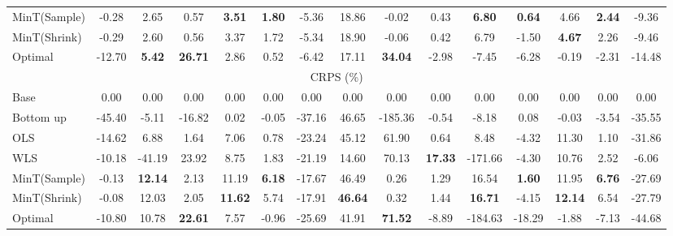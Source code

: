 \documentclass[12pt]{article}
\theoremstyle{definition}
\begin{document}
\begin{table}[H]
{\begin{tabular}{lcccccccccccccc}
			MinT(Sample) & -0.28 & 2.65 & 0.57 & \textbf{3.51} & \textbf{1.80} & -5.36 & 18.86 & -0.02 & 0.43 & \textbf{6.80}& \textbf{0.64} & 4.66 & \textbf{2.44} & -9.36\\
			MinT(Shrink) & -0.29 & 2.60 & 0.56 & 3.37 & 1.72 & -5.34 & 18.90 & -0.06 & 0.42 & 6.79 & -1.50 & \textbf{4.67} & 2.26 & -9.46\\
			Optimal & -12.70 & \textbf{5.42} & \textbf{26.71} & 2.86 & 0.52 & -6.42 & 17.11 & \textbf{34.04} & -2.98 & -7.45 & -6.28 & -0.19 & -2.31 & -14.48\\	
			\toprule
			\multicolumn{15}{c}{CRPS (\%)}\\
			\toprule
			Base & 0.00 & 0.00 & 0.00 & 0.00 & 0.00 & 0.00 & 0.00 & 0.00 & 0.00 & 0.00 & 0.00 & 0.00 & 0.00 & 0.00\\
			Bottom up & -45.40 & -5.11 & -16.82 & 0.02 & -0.05 & -37.16 & 46.65 & -185.36 & -0.54 & -8.18 & 0.08 & -0.03 & -3.54 & -35.55\\
			OLS & -14.62 & 6.88 & 1.64 & 7.06 & 0.78 & -23.24 & 45.12 & 61.90 & 0.64 & 8.48 & -4.32 & 11.30 & 1.10 & -31.86\\
			WLS & -10.18 & -41.19 & 23.92 & 8.75 & 1.83 & -21.19 & 14.60 & 70.13 & \textbf{17.33} & -171.66 & -4.30 & 10.76 & 2.52 & -6.06\\
			MinT(Sample) & -0.13 & \textbf{12.14} & 2.13 & 11.19 & \textbf{6.18} & -17.67 & 46.49 & 0.26 & 1.29 & 16.54 & \textbf{1.60} & 11.95 & \textbf{6.76} & -27.69\\
			MinT(Shrink) & -0.08 & 12.03 & 2.05 & \textbf{11.62} & 5.74 & -17.91 & \textbf{46.64} & 0.32 & 1.44 & \textbf{16.71} & -4.15 & \textbf{12.14} & 6.54 & -27.79\\
			Optimal & -10.80 & 10.78 & \textbf{22.61} & 7.57 & -0.96 & -25.69 & 41.91 & \textbf{71.52} & -8.89 & -184.63 & -18.29 & -1.88 & -7.13 & -44.68\\
			\bottomrule
		\end{tabular}
	}
\end{table}
\end{document}
